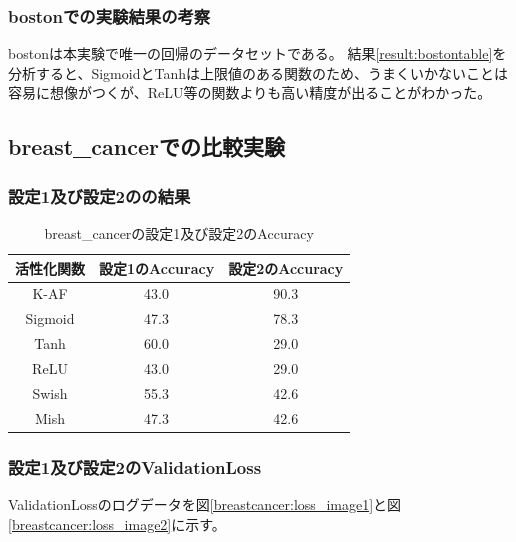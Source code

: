 \subsubsection{bostonでの実験結果の考察}
bostonは本実験で唯一の回帰のデータセットである。
結果\ref{result:bostontable}を分析すると、SigmoidとTanhは上限値のある関数のため、うまくいかないことは容易に想像がつくが、ReLU等の関数よりも高い精度が出ることがわかった。





\subsection{breast\_cancerでの比較実験}
\label{ev:breastcancer}

\subsubsection{設定1及び設定2のの結果}


\begin{table}[htbp]
    \begin{center}
        \caption{breast\_cancerの設定1及び設定2のAccuracy}
        \label{result:breastcancer}
        \vspace{2mm} 
        \begin{tabular}{|c|c|c|}
            \hline
            活性化関数              & 設定1のAccuracy &  設定2のAccuracy \\
            \hline
            K-AF            & 43.0 & 90.3 \\
            \hline
            Sigmoid            & 47.3 & 78.3\\
            \hline
            Tanh            & 60.0 & 29.0\\
            \hline
            ReLU        & 43.0 & 29.0\\
            \hline
            Swish           & 55.3 & 42.6\\
            \hline
            Mish           & 47.3 & 42.6\\
            \hline
        \end{tabular}
    \end{center}
\end{table}




\subsubsection{設定1及び設定2のValidationLoss}
\label{breastcancer:loss}
ValidationLossのログデータを図\ref{breastcancer:loss_image1}と図\ref{breastcancer:loss_image2}に示す。


